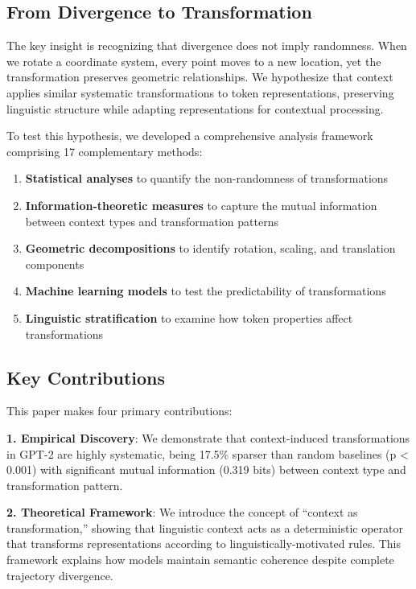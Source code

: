 \subsection{From Divergence to Transformation}

The key insight is recognizing that divergence does not imply randomness. When we rotate a coordinate system, every point moves to a new location, yet the transformation preserves geometric relationships. We hypothesize that context applies similar systematic transformations to token representations, preserving linguistic structure while adapting representations for contextual processing.

To test this hypothesis, we developed a comprehensive analysis framework comprising 17 complementary methods:

\begin{enumerate}
    \item \textbf{Statistical analyses} to quantify the non-randomness of transformations
    \item \textbf{Information-theoretic measures} to capture the mutual information between context types and transformation patterns
    \item \textbf{Geometric decompositions} to identify rotation, scaling, and translation components
    \item \textbf{Machine learning models} to test the predictability of transformations
    \item \textbf{Linguistic stratification} to examine how token properties affect transformations
\end{enumerate}

\subsection{Key Contributions}

This paper makes four primary contributions:

\textbf{1. Empirical Discovery}: We demonstrate that context-induced transformations in GPT-2 are highly systematic, being 17.5\% sparser than random baselines (p < 0.001) with significant mutual information (0.319 bits) between context type and transformation pattern.

\textbf{2. Theoretical Framework}: We introduce the concept of ``context as transformation,'' showing that linguistic context acts as a deterministic operator that transforms representations according to linguistically-motivated rules. This framework explains how models maintain semantic coherence despite complete trajectory divergence.

